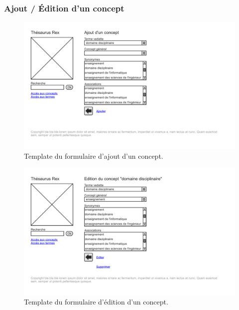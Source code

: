 \subsubsection{Ajout / Édition d'un concept}
\begin{figure}[H]
\begin{center}
\includegraphics[width=\textwidth]{files/template_concept_add}
\end{center}
\caption{Template du formulaire d'ajout d'un concept.}
\end{figure}
\begin{figure}[H]
\begin{center}
\includegraphics[width=\textwidth]{files/template_concept_edit}
\end{center}
\caption{Template du formulaire d’édition d'un concept.}
\end{figure}

